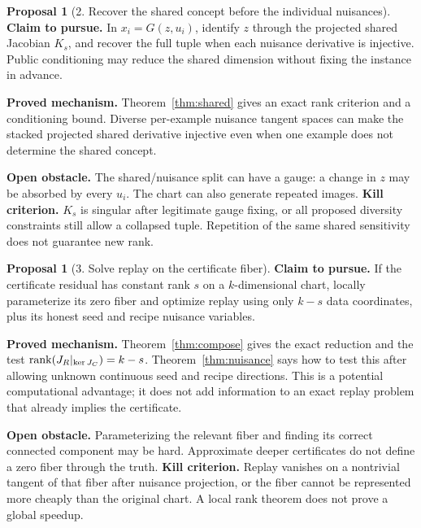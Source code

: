 \documentclass[11pt,a4paper]{article}
\theoremstyle{definition}
\theoremstyle{definition}
\newtheorem{proposal}[theorem]{Proposal}
\theoremstyle{remark}\newtheorem{remark}[theorem]{Remark}
\begin{document}
\begin{proposal}[2. Recover the shared concept before the individual nuisances]
\textbf{Claim to pursue.} In $x_i=G(z,u_i)$, identify $z$ through the projected shared Jacobian $K_s$, and recover the full tuple when each nuisance derivative is injective. Public conditioning may reduce the shared dimension without fixing the instance in advance.

\textbf{Proved mechanism.} Theorem~\ref{thm:shared} gives an exact rank criterion and a conditioning bound. Diverse per-example nuisance tangent spaces can make the stacked projected shared derivative injective even when one example does not determine the shared concept.

\textbf{Open obstacle.} The shared/nuisance split can have a gauge: a change in $z$ may be absorbed by every $u_i$. The chart can also generate repeated images. \textbf{Kill criterion.} $K_s$ is singular after legitimate gauge fixing, or all proposed diversity constraints still allow a collapsed tuple. Repetition of the same shared sensitivity does not guarantee new rank.
\end{proposal}

\begin{proposal}[3. Solve replay on the certificate fiber]
\textbf{Claim to pursue.} If the certificate residual has constant rank $s$ on a $k$-dimensional chart, locally parameterize its zero fiber and optimize replay using only $k-s$ data coordinates, plus its honest seed and recipe nuisance variables.

\textbf{Proved mechanism.} Theorem~\ref{thm:compose} gives the exact reduction and the test $\operatorname{rank}(J_R|_{\ker J_C})=k-s$. Theorem~\ref{thm:nuisance} says how to test this after allowing unknown continuous seed and recipe directions. This is a potential computational advantage; it does not add information to an exact replay problem that already implies the certificate.

\textbf{Open obstacle.} Parameterizing the relevant fiber and finding its correct connected component may be hard. Approximate deeper certificates do not define a zero fiber through the truth. \textbf{Kill criterion.} Replay vanishes on a nontrivial tangent of that fiber after nuisance projection, or the fiber cannot be represented more cheaply than the original chart. A local rank theorem does not prove a global speedup.
\end{proposal}
\end{document}

